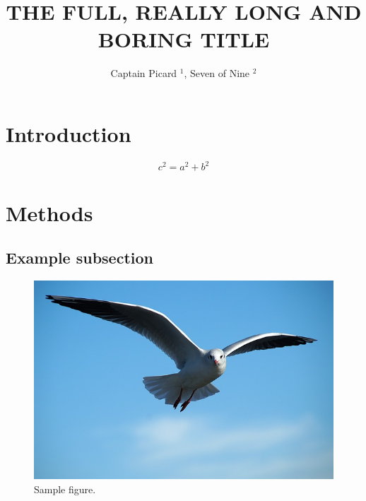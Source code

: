\documentclass[en]{prtclass}
\author{Captain Picard $^1$, Seven of Nine $^2$}
\title{THE FULL, REALLY LONG AND BORING TITLE}
\begin{document}
\maketitle

\section{Introduction}
\blindtext[2]
\begin{equation}
c^{2} = a^{2} + b^{2} 
\end{equation}
\blindtext[2]


\section{Methods}
\blindtext[1]
\subsection{Example subsection}
\blindtext[1]
\begin{figure}
    \centering
    \includegraphics[width = 0.8\linewidth]{figures/sample_figure.jpg}
    \caption{Sample figure.}
    \label{fig:results}
\end{figure}

\blindtext[1]
\end{document}
